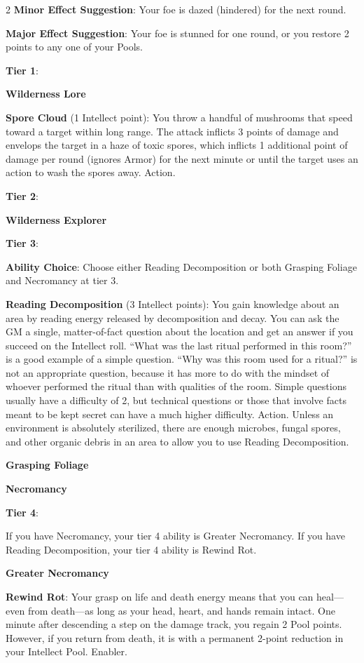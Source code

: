 \begin{multicols}{2}
\textbf{Minor Effect Suggestion}: Your foe is dazed (hindered) for the next round.

\textbf{Major Effect Suggestion}: Your foe is stunned for one round, or you restore 2 points to any one of your Pools.

\textbf{Tier 1}:

\textbf{Wilderness Lore}
 
\textbf{Spore Cloud} (1 Intellect point): You throw a handful of mushrooms that speed toward a target within long range. The attack inflicts 3 points of damage and envelops the target in a haze of toxic spores, which inflicts 1 additional point of damage per round (ignores Armor) for the next minute or until the target uses an action to wash the spores away. Action.

\textbf{Tier 2}:

\textbf{Wilderness Explorer}

\textbf{Tier 3}:

\textbf{Ability Choice}: Choose either Reading Decomposition or both Grasping Foliage and Necromancy at tier 3.

\textbf{Reading Decomposition} (3 Intellect points): You gain knowledge about an area by reading energy released by decomposition and decay. You can ask the GM a single, matter-of-fact question about the location and get an answer if you succeed on the Intellect roll. “What was the last ritual performed in this room?” is a good example of a simple question. “Why was this room used for a ritual?” is not an appropriate question, because it has more to do with the mindset of whoever performed the ritual than with qualities of the room. Simple questions usually have a difficulty of 2, but technical questions or those that involve facts meant to be kept secret can have a much higher difficulty. Action.
Unless an environment is absolutely sterilized, there are enough microbes, fungal spores, and other organic debris in an area to allow you to use Reading Decomposition.

\textbf{Grasping Foliage}

\textbf{Necromancy}

\textbf{Tier 4}:

If you have Necromancy, your tier 4 ability is Greater Necromancy. If you have Reading Decomposition, your tier 4 ability is Rewind Rot.

\textbf{Greater Necromancy}

\textbf{Rewind Rot}: Your grasp on life and death energy means that you can heal—even from death—as long as your head, heart, and hands remain intact. One minute after descending a step on the damage track, you regain 2 Pool points. However, if you return from death, it is with a permanent 2-point reduction in your Intellect Pool. Enabler.


\end{multicols}
